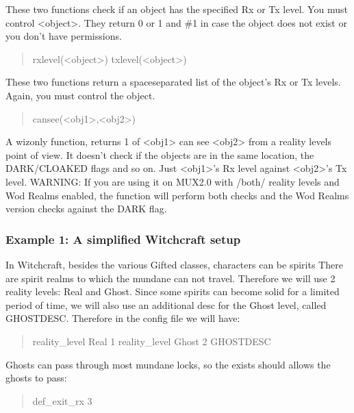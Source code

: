 \documentclass[letterpaper,10pt,english]{sphinxmanual}
\begin{document}
\sphinxAtStartPar
These two functions check if an object has the specified Rx or Tx level.
You must control \textless{}object\textgreater{}. They return 0 or 1 and \#\sphinxhyphen{}1 in case the object
does not exist or you don’t have permissions.
\begin{quote}

\sphinxAtStartPar
rxlevel(\textless{}object\textgreater{})
txlevel(\textless{}object\textgreater{})
\end{quote}

\sphinxAtStartPar
These two functions return a space\sphinxhyphen{}separated list of the object’s Rx or Tx
levels. Again, you must control the object.
\begin{quote}

\sphinxAtStartPar
cansee(\textless{}obj1\textgreater{},\textless{}obj2\textgreater{})
\end{quote}

\sphinxAtStartPar
A wiz\sphinxhyphen{}only function, returns 1 of \textless{}obj1\textgreater{} can see \textless{}obj2\textgreater{} from a reality
levels point of view. It doesn’t check if the objects are in the same
location, the DARK/CLOAKED flags and so on. Just \textless{}obj1\textgreater{}’s Rx level against
\textless{}obj2\textgreater{}’s Tx level.
WARNING: If you are using it on MUX2.0 with /both/ reality levels and Wod
Realms enabled, the function will perform both checks and the Wod Realms
version checks against the DARK flag.


\subsubsection{Example 1: A simplified Witchcraft setup}
\label{\detokenize{advanced:example-1-a-simplified-witchcraft-setup}}
\sphinxAtStartPar
In Witchcraft, besides the various Gifted classes, characters can be spirits
There are spirit realms to which the mundane can not travel. Therefore we
will use 2 reality levels: Real and Ghost. Since some spirits can become
solid for a limited period of time, we will also use an additional desc for
the Ghost level, called GHOSTDESC. Therefore in the config file we will
have:
\begin{quote}

\sphinxAtStartPar
reality\_level Real 1
reality\_level Ghost 2 GHOSTDESC
\end{quote}

\sphinxAtStartPar
Ghosts can pass through most mundane locks, so the exists should allows the
ghosts to pass:
\begin{quote}

\sphinxAtStartPar
def\_exit\_rx 3
\end{quote}
\end{document}
